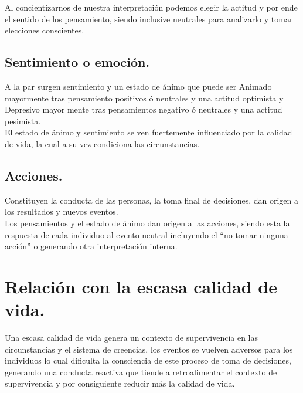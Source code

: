 \documentclass[10pt]{article}
\begin{document}
Al concientizarnos de nuestra interpretación podemos elegir la actitud y por ende el sentido de los pensamiento, siendo inclusive neutrales para analizarlo y tomar elecciones  conscientes.

\subsection{ Sentimiento o emoción.}

A la par surgen sentimiento y un estado de ánimo que puede ser Animado mayormente tras pensamiento positivos ó neutrales y una actitud optimista y Depresivo mayor mente tras pensamientos negativo ó neutrales y una actitud pesimista.\\

El estado de ánimo y sentimiento se ven fuertemente influenciado por la calidad de vida, la cual a su vez condiciona las circunstancias. 

\subsection{ Acciones.}

Constituyen la conducta de las personas, la toma final de decisiones, dan origen a los resultados y nuevos eventos.\\

Los pensamientos y el estado de ánimo dan origen a las acciones, siendo esta la respuesta de cada individuo al evento neutral incluyendo el “no tomar ninguna acción” o generando otra interpretación interna.  
\newpage
\section{ Relación con la escasa calidad de vida.}

Una escasa calidad de vida genera un contexto de supervivencia en las circunstancias y el sistema de creencias, los eventos se vuelven adversos para los individuos lo cual  dificulta la consciencia de este proceso de toma de decisiones, generando una conducta reactiva que tiende a retroalimentar el contexto de supervivencia y por consiguiente reducir más la calidad de vida.
\end{document}
